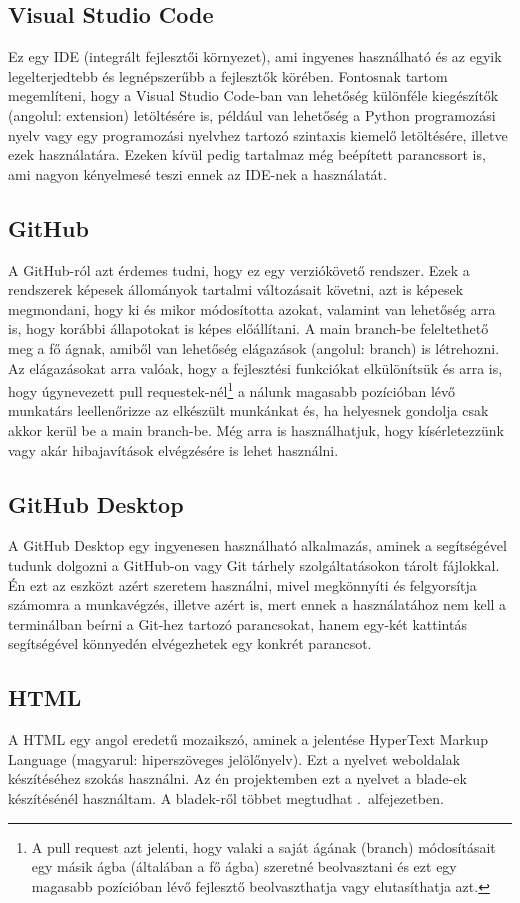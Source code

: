 \documentclass[]{thesis-ekf}
\theoremstyle{definition}
\theoremstyle{remark}
\begin{document}
	\subsection{Visual Studio Code}
		Ez egy IDE (integrált fejlesztői környezet), ami ingyenes használható és az egyik legelterjedtebb és legnépszerűbb a fejlesztők körében. Fontosnak tartom megemlíteni, hogy a Visual Studio Code-ban van lehetőség különféle kiegészítők (angolul: extension) letöltésére is, például van lehetőség a Python programozási nyelv vagy egy programozási nyelvhez tartozó szintaxis kiemelő letöltésére, illetve ezek használatára. Ezeken kívül pedig tartalmaz még beépített parancssort is, ami nagyon kényelmesé teszi ennek az IDE-nek a használatát. 
	\subsection{GitHub}
		A GitHub-ról azt érdemes tudni, hogy ez egy verziókövető rendszer. Ezek a rendszerek képesek állományok tartalmi változásait követni, azt is képesek megmondani, hogy ki és mikor módosította azokat, valamint van lehetőség arra is, hogy korábbi állapotokat is képes előállítani. A main branch-be feleltethető meg a fő ágnak, amiből van lehetőség elágazások (angolul: branch) is létrehozni. Az elágazásokat arra valóak, hogy a fejlesztési funkciókat elkülönítsük és arra is, hogy úgynevezett pull requestek-nél\footnote{A pull request azt jelenti, hogy valaki a saját ágának (branch) módosításait egy másik ágba (általában a fő ágba) szeretné beolvasztani és ezt egy magasabb pozícióban lévő fejlesztő beolvaszthatja vagy elutasíthatja azt.} a nálunk magasabb pozícióban lévő munkatárs leellenőrizze az elkészült munkánkat és, ha helyesnek gondolja csak akkor kerül be a main branch-be. Még arra is használhatjuk, hogy kísérletezzünk vagy akár hibajavítások elvégzésére is lehet használni.
	\subsection{GitHub Desktop}
		A GitHub Desktop egy ingyenesen használható alkalmazás, aminek a segítségével tudunk dolgozni a GitHub-on vagy Git tárhely szolgáltatásokon tárolt fájlokkal. Én ezt az eszközt azért szeretem használni, mivel megkönnyíti és felgyorsítja számomra a munkavégzés, illetve azért is, mert ennek a használatához nem kell a terminálban beírni a Git-hez tartozó parancsokat, hanem egy-két kattintás segítségével könnyedén elvégezhetek egy konkrét parancsot. \cite{GitHubDesktop}
	\subsection{HTML}
		A HTML egy angol eredetű mozaikszó, aminek a jelentése HyperText Markup Language (magyarul: hiperszöveges jelölőnyelv). Ezt a nyelvet weboldalak készítéséhez szokás használni. Az én projektemben ezt a nyelvet a blade-ek készítésénél használtam. A bladek-ről többet megtudhat .~alfejezetben.   
\end{document}

